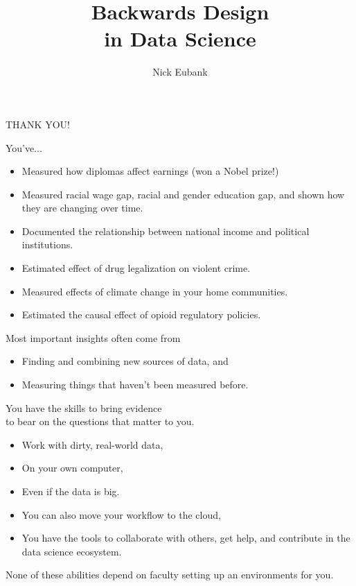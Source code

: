 \documentclass[11pt]{beamer}
\title{Backwards Design \\ in Data Science}
\author{\small Nick Eubank}
\date{\vspace*{.3in} \date}
\begin{document}
\begin{frame}[c]
\centering
\pause THANK YOU!
\end{frame}

\begin{frame}[c]{}
You've...
  \begin{itemize}
    \item Measured how diplomas affect earnings (won a Nobel prize!)
    \pause \item Measured racial wage gap, racial and gender education gap, and shown how they are changing over time.
    \pause \item Documented the relationship between national income and political institutions.
    \pause \item Estimated effect of drug legalization on violent crime.
    \pause \item Measured effects of climate change in your home communities.
    \pause \item Estimated the causal effect of opioid regulatory policies.
  \end{itemize}
\end{frame}

\begin{frame}[c]{}
Most important insights often come from
\begin{itemize}
  \pause \item Finding and combining new sources of data, and
  \pause \item Measuring things that haven't been measured before.
\end{itemize}
\end{frame}

\begin{frame}[c]{}
\begin{center}
  You have the skills to bring evidence \\
  to bear \alert{on the questions that matter to you.}

\end{center}

\begin{itemize}
  \pause \item Work with dirty, real-world data,
  \pause \item On your own computer,
  \pause \item Even if the data is big.
  \pause \item You can also move your workflow to the cloud,
  \pause \item You have the tools to collaborate with others, get help, and contribute in the data science ecosystem.
\end{itemize}
\vspace*{0.2cm}
\pause \alert{None} of these abilities depend on faculty setting up an environments for you.\\
\end{frame}
\end{document}
